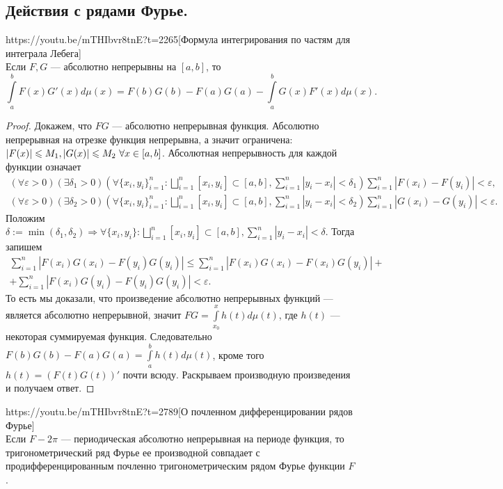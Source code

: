 \subsection{Действия с рядами Фурье.}
\begin{linklm}{https://youtu.be/mTHIbvr8tnE?t=2265}[Формула интегрирования по частям для интеграла Лебега]\ \\
	Если $F, G$ --- абсолютно непрерывны на $[a,b]$, то $$\int\limits_a^bF(x)G'(x)d\mu(x)=F(b)G(b)-F(a)G(a)-\int\limits_a^bG(x)F'(x)d\mu(x).$$
\end{linklm}
\begin{proof}
	Докажем, что $FG$ --- абсолютно непрерывная функция. 
	Абсолютно непрерывная на отрезке функция непрерывна, а значит ограничена: $ |F(x)|\leqslant M_1,\\|G(x)|\leqslant M_2\ \forall x\in[a,b]$. Абсолютная непрерывность для каждой функции означает
	\begin{align*}
		(\forall\varepsilon>0)(\exists \delta_1>0)(\forall\{x_i,y_i\}_{i=1}^n:\bigsqcup\limits_{i=1}^n[x_i,y_i]\subset [a,b], \sum\limits_{i=1}^n|y_i-x_i|<\delta_1)\sum\limits_{i=1}^n|F(x_i)-F(y_i)|<\varepsilon,\\
		(\forall\varepsilon>0)(\exists \delta_2>0)(\forall\{x_i,y_i\}_{i=1}^n:\bigsqcup\limits_{i=1}^n[x_i,y_i]\subset [a,b], \sum\limits_{i=1}^n|y_i-x_i|<\delta_2)\sum\limits_{i=1}^n|G(x_i)-G(y_i)|<\varepsilon.
	\end{align*} 
Положим $\delta:=\min(\delta_1, \delta_2)\Rightarrow \forall\{x_i,y_i\}:\bigsqcup\limits_{i=1}^n[x_i,y_i]\subset[a,b],\sum\limits_{i=1}^n |y_i-x_i|<\delta$. Тогда запишем
\begin{multline*}
	\sum\limits_{i=1}^n|F(x_i)G(x_i)-F(y_i)G(y_i)|\leqslant \sum\limits_{i=1}^n |F(x_i)G(x_i)-F(x_i)G(y_i)|+\\+\sum\limits_{i=1}^n |F(x_i)G(y_i)-F(y_i)G(y_i)|<\varepsilon.
\end{multline*} 
То есть мы доказали, что произведение абсолютно непрерывных функций --- является абсолютно непрерывной, значит $FG=\int\limits_{x_0}^x h(t)d\mu(t)$, где $h(t)$ --- некоторая суммируемая функция. Следовательно $F(b)G(b)-F(a)G(a)=\int\limits_a^b h(t)d\mu(t)$, кроме того $h(t)=(F(t)G(t))'$ почти всюду. Раскрываем производную произведения и получаем ответ.
\end{proof}

\begin{linkthm}{https://youtu.be/mTHIbvr8tnE?t=2789}[О почленном дифференцировании рядов Фурье]\ \\
	Если $F-2\pi$ --- периодическая абсолютно непрерывная на периоде функция, то тригонометрический ряд Фурье ее производной совпадает с продифференцированным почленно тригонометрическим рядом Фурье функции $F$.
\end{linkthm}


